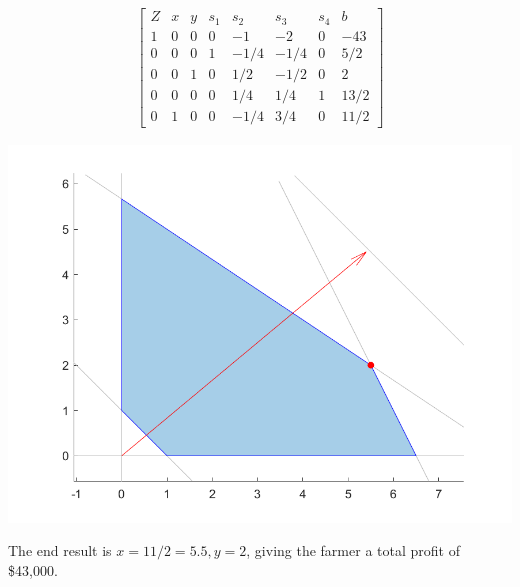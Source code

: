 \documentclass[10pt]{article}
\newenvironment{answerblock}[1]{\tcolorbox[beamer,noparskip,breakable,title={#1}]}{\endtcolorbox}
\begin{document}
\begin{answerblock}{Linear Programming Example Evaluation}
	\vspace{6pt}
	\begin{minipage}{0.6\textwidth}
		\begin{align*}
		\begin{bmatrix}
		Z	& x		& y		& s_1	& s_2	& s_3	& s_4	& b \\
		1	& 0		& 0		& 0		& -1	& -2	& 0		& -43 \\
		0	& 0		& 0		& 1		& -1/4	& -1/4	& 0		& 5/2 \\
		0	& 0		& 1		& 0		& 1/2	& -1/2	& 0		& 2 \\
		0	& 0		& 0		& 0		& 1/4	& 1/4	& 1		& 13/2 \\
		0	& 1		& 0		& 0		& -1/4	& 3/4	& 0		& 11/2
		\end{bmatrix}
		\end{align*}
	\end{minipage} \hfill
	\begin{minipage}{0.35\textwidth}
		\includegraphics[width = \textwidth]{images/paper_simplex_point_3.png}
	\end{minipage}

	\vspace{6pt}
	The end result is $x=11/2 = 5.5, y = 2$, giving the farmer a total profit of \$43,000.
	
\end{answerblock}
\end{document}
